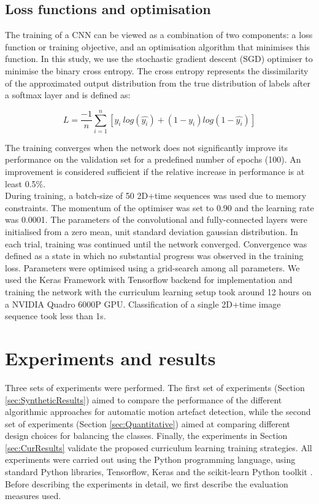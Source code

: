 \documentclass[preprint,12pt,authoryear]{elsarticle}
\begin{document}
\subsection{Loss functions and optimisation}
\label{sec:implementationdetails}

The training of a CNN can be viewed as a combination of two components: a loss function or training objective, and an optimisation algorithm that minimises this function. In this study, we use the stochastic gradient descent (SGD) optimiser  to minimise the binary cross entropy. The cross entropy represents the dissimilarity of the approximated output distribution from the true distribution of labels after a softmax layer and is defined as:


$$L= \dfrac{-1}{n} \sum_{i=1}^n  [y_{i}~log(\hat{y_{i}}) + (1-y_i)log(1-\hat{y_i}) ] $$


The training converges when the network does not significantly improve its performance on the validation set for a predefined number of epochs (100). An improvement is considered sufficient if the relative increase in performance is at least 0.5\%.  \\

During training, a batch-size of 50 2D+time sequences was used due to memory constraints. The  momentum of the optimiser was set to 0.90 and the learning rate was 0.0001. The parameters of the convolutional and fully-connected layers were initialised from a zero mean, unit standard deviation gaussian distribution. In each trial, training was continued until the network converged. Convergence was defined as a state in which no substantial progress was observed in the training loss. Parameters were optimised using a grid-search among all parameters. We used the Keras Framework with Tensorflow backend for implementation and training the network with the curriculum learning setup took around 12 hours on a NVIDIA Quadro 6000P GPU. Classification of a single 2D+time image  sequence took less than 1s.

\section{Experiments and results}
\label{sec:experiments_results}


Three sets of experiments were performed. The first set of experiments (Section \ref{sec:SyntheticResults}) aimed to compare the performance of the different algorithmic approaches for automatic motion artefact detection, while the second set of experiments (Section \ref{sec:Quantitative}) aimed at comparing different design choices for balancing the classes. Finally, the experiments in Section \ref{sec:CurResults} validate the proposed curriculum learning training strategies.
All experiments were carried out using the Python programming language, using standard Python libraries, Tensorflow, Keras and the scikit-learn Python toolkit \citep{Pedregosa2011}.
Before describing the experiments in detail, we first describe the evaluation measures used.\\
\end{document}
